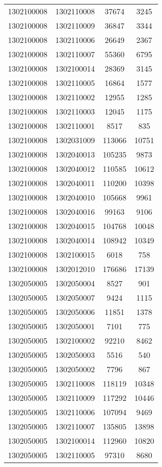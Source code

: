 \begin{longtable}[h]{llcc}
		1302100008 & 1302110008 & 37674 & 3245\\
		1302100008 & 1302110009 & 36847 & 3344\\
		1302100008 & 1302110006 & 26649 & 2367\\
		1302100008 & 1302110007 & 55360 & 6795\\
		1302100008 & 1302100014 & 28369 & 3145\\
		1302100008 & 1302110005 & 16864 & 1577\\
		1302100008 & 1302110002 & 12955 & 1285\\
		1302100008 & 1302110003 & 12045 & 1175\\
		1302100008 & 1302110001 & 8517 & 835\\
		1302100008 & 1302031009 & 113066 & 10751\\
		1302100008 & 1302040013 & 105235 & 9873\\
		1302100008 & 1302040012 & 110585 & 10612\\
		1302100008 & 1302040011 & 110200 & 10398\\
		1302100008 & 1302040010 & 105668 & 9961\\
		1302100008 & 1302040016 & 99163 & 9106\\
		1302100008 & 1302040015 & 104768 & 10048\\
		1302100008 & 1302040014 & 108942 & 10349\\
		1302100008 & 1302100015 & 6018 & 758\\
		1302100008 & 1302012010 & 176686 & 17139\\
		1302050005 & 1302050004 & 8527 & 901\\
		1302050005 & 1302050007 & 9424 & 1115\\
		1302050005 & 1302050006 & 11851 & 1378\\
		1302050005 & 1302050001 & 7101 & 775\\
		1302050005 & 1302100002 & 92210 & 8462\\
		1302050005 & 1302050003 & 5516 & 540\\
		1302050005 & 1302050002 & 7796 & 867\\
		1302050005 & 1302110008 & 118119 & 10348\\
		1302050005 & 1302110009 & 117292 & 10446\\
		1302050005 & 1302110006 & 107094 & 9469\\
		1302050005 & 1302110007 & 135805 & 13898\\
		1302050005 & 1302100014 & 112960 & 10820\\
		1302050005 & 1302110005 & 97310 & 8680\\

\end{longtable}
